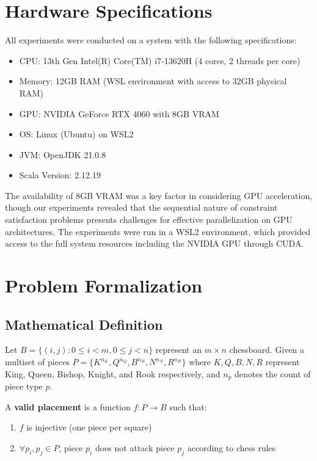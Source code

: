 \documentclass[12pt,a4paper]{article}
\theoremstyle{definition}
\begin{document}
\section{Hardware Specifications}

All experiments were conducted on a system with the following specifications:
\begin{itemize}
    \item CPU: 13th Gen Intel(R) Core(TM) i7-13620H (4 cores, 2 threads per core)
    \item Memory: 12GB RAM (WSL environment with access to 32GB physical RAM)
    \item GPU: NVIDIA GeForce RTX 4060 with 8GB VRAM
    \item OS: Linux (Ubuntu) on WSL2
    \item JVM: OpenJDK 21.0.8
    \item Scala Version: 2.12.19
\end{itemize}

The availability of 8GB VRAM was a key factor in considering GPU acceleration, though our experiments revealed that the sequential nature of constraint satisfaction problems presents challenges for effective parallelization on GPU architectures. The experiments were run in a WSL2 environment, which provided access to the full system resources including the NVIDIA GPU through CUDA.

\section{Problem Formalization}

\subsection{Mathematical Definition}

Let $B = \{(i,j) : 0 \leq i < m, 0 \leq j < n\}$ represent an $m \times n$ chessboard. Given a multiset of pieces $P = \{K^{n_K}, Q^{n_Q}, B^{n_B}, N^{n_N}, R^{n_R}\}$ where $K, Q, B, N, R$ represent King, Queen, Bishop, Knight, and Rook respectively, and $n_p$ denotes the count of piece type $p$.

A \textbf{valid placement} is a function $f: P \rightarrow B$ such that:
\begin{enumerate}
\item $f$ is injective (one piece per square)
\item $\forall p_i, p_j \in P$, piece $p_i$ does not attack piece $p_j$ according to chess rules
\end{enumerate}
\end{document}
